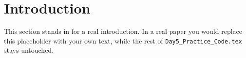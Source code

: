 \section{Introduction}
\label{sec:intro}
This section stands in for a real introduction. In a real paper you
would replace this placeholder with your own text, while the rest of
\texttt{Day5\_Practice\_Code.tex} stays untouched.

